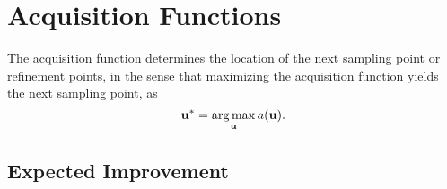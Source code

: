 \section{Acquisition Functions}\label{uq:ego:acq}

The acquisition function determines the location of the next sampling point or refinement points, in the sense that maximizing the acquisition function yields the next sampling point, as
\begin{equation}
{\bf u}^* = \operatorname*{arg\,max}_{\bf u} a({\bf u}).
\end{equation}

\subsection{Expected Improvement}\label{uq:ego:acq:eif}

